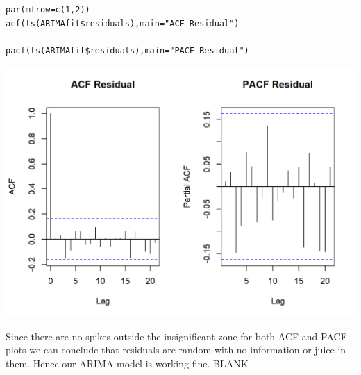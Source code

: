 \documentclass[a4paper,12pt]{article}
\begin{document}
\begin{verbatim}
par(mfrow=c(1,2))
acf(ts(ARIMAfit$residuals),main="ACF Residual")

pacf(ts(ARIMAfit$residuals),main="PACF Residual")
\end{verbatim}

\includegraphics[]{00-B2/images/Speedboat_Sales_8.png}

\noindent Since there are no spikes outside the insignificant zone for both ACF and PACF plots we can conclude
that residuals are random with no information or juice in them. Hence our ARIMA model is working
fine.
\newpage
BLANK
\end{document}
